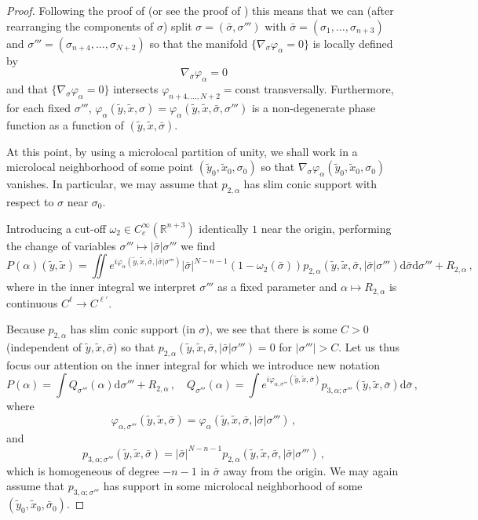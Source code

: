 \documentclass[11pt]{amsart}
\theoremstyle{definition}
\numberwithin{equation}{section}
\newcommand{\mR}{\mathbb{R}}                    %
\newcommand{\abs}[1]{\lvert #1 \rvert}          %
\newcommand{\dd}{\mathrm{d}}
\begin{document}
\begin{proof}
	Following the proof of \cite[Lem.~7.1]{zbMATH03481135} (or see the proof of \cite[Prop.~25.1.5']{zbMATH05528184}) this means that we can (after rearranging the components of $\sigma$) split $\sigma = (\bar \sigma,\sigma''')$ with $\bar \sigma = (\sigma_{1},\dots,\sigma_{n+3})$ and $\sigma''' = (\sigma_{n+4},\dots,\sigma_{N+2})$ so that the manifold $\{\nabla_\sigma \varphi_\alpha= 0\}$ is locally defined by 	
	\[
		\nabla_{\bar\sigma} \varphi_\alpha = 0
	\]
	and that $\{\nabla_\sigma \varphi_\alpha =0\}$ intersects $\varphi_{n+4,\dots,N+2}=\mathrm{const}$ transversally. Furthermore, for each fixed $\sigma'''$, $\varphi_\alpha(\tilde{y},\tilde{x},\sigma)=\varphi_\alpha(\tilde{y},\tilde{x},\bar\sigma,\sigma''')$ is a non-degenerate phase function as a function of $(\tilde{y},\tilde{x},\bar \sigma)$.

    At this point, by using a microlocal partition of unity, we shall work in a microlocal neighborhood of some point $(\tilde{y}_0,\tilde{x}_0,\sigma_0)$ so that $\nabla_\sigma \varphi_\alpha(\tilde{y}_0,\tilde{x}_0,\sigma_0)$ vanishes. In particular, we may assume that $p_{2,\alpha}$ has slim conic support with respect to $\sigma$ near $\sigma_0$.

	Introducing a cut-off $\omega_2\in C_c^\infty(\mR^{n+3})$ identically $1$ near the origin, performing the change of variables $\sigma'''\mapsto \abs{\bar\sigma}\sigma'''$ we find
	\[
		P(\alpha)(\tilde{y},\tilde{x}) = \iint e^{i\varphi_{\alpha}(\tilde{y},\tilde{x},\bar \sigma,\abs{\bar\sigma}\sigma''')} \abs{\bar\sigma}^{N-n-1}(1-\omega_2(\bar\sigma))p_{2,\alpha}(\tilde{y},\tilde{x},\bar\sigma,\abs{\bar\sigma}\sigma''')\dd\bar \sigma\dd\sigma'''+R_{2,\alpha}\,,
	\]
	where in the inner integral we interpret $\sigma'''$ as a fixed parameter and $\alpha\mapsto R_{2,\alpha}$ is continuous $C^{\ell}\to C^{\ell'}$. 
    
    Because $p_{2,\alpha}$ has slim conic support (in $\sigma$), we see that there is some $C>0$ (independent of $\tilde{y},\tilde{x},\bar\sigma$) so that $p_{2,\alpha}(\tilde{y},\tilde{x},\bar\sigma,\abs{\bar\sigma}\sigma''') = 0$ for $\abs{\sigma'''} > C$. Let us thus focus our attention on the inner integral for which we introduce new notation
	\begin{equation}\label{eq:introPQ}
		P(\alpha) = \int Q_{\sigma'''}(\alpha) \dd \sigma''' +R_{2,\alpha}\,,\quad Q_{\sigma'''}(\alpha) = \int e^{i\varphi_{\alpha,\sigma'''}(\tilde{y},\tilde{x},\bar \sigma)} p_{3,\alpha;\sigma'''}(\tilde{y},\tilde{x},\bar\sigma)\dd\bar \sigma\,,
	\end{equation}
	where
	\[
		\varphi_{\alpha,\sigma'''}(\tilde{y},\tilde{x},\bar \sigma) = \varphi_{\alpha}(\tilde{y},\tilde{x},\bar \sigma,\abs{\bar\sigma}\sigma''')\,,
	\]
	and 
	\[
		p_{3,\alpha;\sigma'''}(\tilde{y},\tilde{x},\bar\sigma) = \abs{\bar\sigma}^{N-n-1}p_{2,\alpha}(\tilde{y},\tilde{x},\bar\sigma,\abs{\bar\sigma}\sigma''')\,,
	\]
    which is homogeneous of degree $-n-1$ in $\bar\sigma$ away from the origin. We may again assume that $p_{3,\alpha;\sigma'''}$ has support in some microlocal neighborhood of some $(\tilde{y}_0,\tilde{x}_0,\bar\sigma_0)$.
    

\end{proof}
\end{document}
